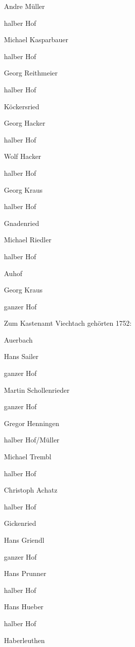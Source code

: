 \documentclass{book}
\begin{document}
Andre Müller

halber Hof



Michael Kasparbauer

halber Hof



Georg Reithmeier

halber Hof

Köckersried

Georg Hacker

halber Hof



Wolf Hacker

halber Hof



Georg Kraus

halber Hof

Gnadenried

Michael Riedler

halber Hof

Auhof

Georg Kraus

ganzer Hof



Zum Kastenamt Viechtach gehörten 1752:



 Auerbach

Hans Sailer

ganzer Hof



Martin Schollenrieder

ganzer Hof



Gregor Henningen

halber Hof/Müller



Michael Trembl

halber Hof



Christoph Achatz

halber Hof

Gickenried

Hans Griendl

ganzer Hof



Hans Prunner

halber Hof



Hans Hueber

halber Hof

Haberleuthen
\end{document}
